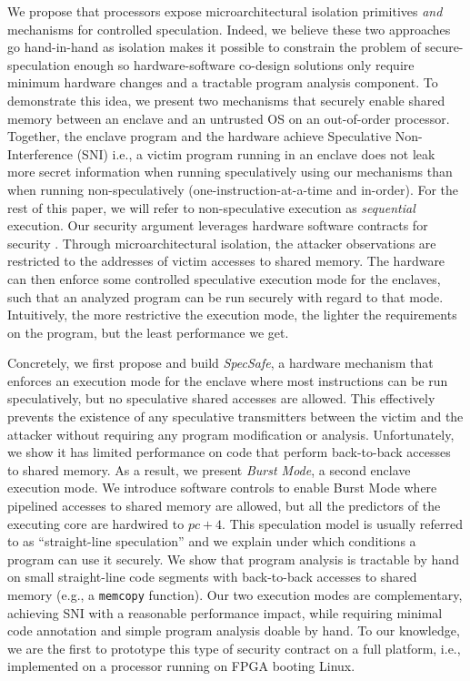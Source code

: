 We propose that processors expose microarchitectural isolation primitives \emph{and} mechanisms for controlled speculation.
Indeed, we believe these two approaches go hand-in-hand as isolation makes it possible to constrain the problem of secure-speculation enough so hardware-software co-design solutions only require minimum hardware changes and a tractable program analysis component.
To demonstrate this idea, we present two mechanisms that securely enable shared memory between an enclave and an untrusted OS on an out-of-order processor.
Together, the enclave program and the hardware achieve Speculative Non-Interference (SNI) \cite{guarnieri2020spectector, guarnieri2021hardware, behnia2021speculative, fabian2022automatic, yu2019speculative, yu2019speculative2} i.e., a victim program running in an enclave does not leak more secret information when running speculatively using our mechanisms than when running non-speculatively (one-instruction-at-a-time and in-order).
For the rest of this paper, we will refer to non-speculative execution as \emph{sequential} execution.
Our security argument leverages hardware software contracts for security \cite{guarnieri2021hardware, mosier2022axiomatic}.
Through microarchitectural isolation, the attacker observations are restricted to the addresses of victim accesses to shared memory.
The hardware can then enforce some controlled speculative execution mode for the enclaves, such that an analyzed program can be run securely with regard to that mode.
Intuitively, the more restrictive the execution mode, the lighter the requirements on the program, but the least performance we get.

Concretely, we first propose and build \emph{SpecSafe}, a hardware mechanism that enforces an execution mode for the enclave where most instructions can be run speculatively, but no speculative shared accesses are allowed.
This effectively prevents the existence of any speculative transmitters between the victim and the attacker without requiring any program modification or analysis.
Unfortunately, we show it has limited performance on code that perform back-to-back accesses to shared memory.
As a result, we present \emph{Burst Mode}, a second enclave execution mode.
We introduce software controls to enable Burst Mode where pipelined accesses to shared memory are allowed, but 
all the predictors of the executing core are hardwired to $pc + 4$.
This speculation model is usually referred to as ``straight-line speculation'' \cite{straightlinespecARM} and we explain under which conditions a program can use it securely. 
We show that program analysis is tractable by hand on small straight-line code segments with back-to-back accesses to shared memory (e.g., a \texttt{memcopy} function).
Our two execution modes are complementary, achieving SNI with a reasonable performance impact, while requiring minimal code annotation and simple program analysis doable by hand. 
To our knowledge, we are the first to prototype this type of security contract on a full platform, i.e., implemented on a processor running on FPGA booting Linux.

